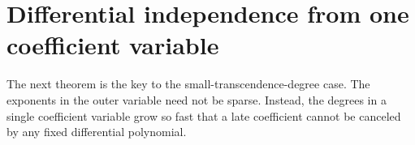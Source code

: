 \documentclass[11pt,letterpaper]{article}
\theoremstyle{definition}
\newtheorem{definition}[theorem]{Definition}
\theoremstyle{remark}
\newcommand{\N}{\mathbb N}
\numberwithin{equation}{section}
\begin{document}
\section{Differential independence from one coefficient variable}
\label{isc:cp:sec:lacunary}

The next theorem is the key to the small-transcendence-degree case. The
exponents in the outer variable need not be sparse. Instead, the degrees in
a single coefficient variable grow so fast that a late coefficient cannot be
canceled by any fixed differential polynomial.

\end{document}
